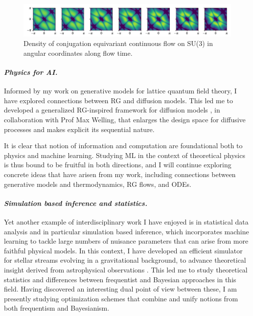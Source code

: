 \documentclass[11pt]{article}
\begin{document}
\begin{figure}
    \centering
    \includegraphics[width=\linewidth]{su3.pdf}
    \vspace{-25pt}
    \caption{\footnotesize Density of conjugation equivariant continuous flow on SU(3) in angular coordinates along flow time.}
    \label{fig:su3}
    \vspace{-10pt}
\end{figure}

\paragraph{\textit{{Physics for AI.}}}
Informed by my work on generative models for lattice quantum field theory, I have explored connections between RG and diffusion models.
This led me to developed a generalized RG-inspired framework for diffusion models \cite{gerdes2024gudgenerationunifieddiffusion}, in collaboration with Prof Max Welling, that enlarges the design space for diffusive processes and makes explicit its sequential nature.

\textbf{\color{royalblue}{Future Directions.}}
It is clear that notion of information and computation are foundational both to physics and machine learning.
Studying ML in the context of theoretical physics is thus bound to be fruitful in both directions, and I will continue exploring concrete ideas that have arisen from my work, including connections between generative models and thermodynamics, RG flows, and ODEs.

\paragraph{\textit{{Simulation based inference and statistics.}}}
Yet another example of interdisciplinary work I have enjoyed is in statistical data analysis and in particular simulation based inference, which incorporates machine learning to tackle large numbers of nuisance parameters that can arise from more faithful physical models.
In this context, I have developed an efficient simulator for stellar streams evolving in a gravitational background, to advance theoretical insight derived from astrophysical observations  \cite{alvey2023AlbatrossScalable}.
This led me to study theoretical statistics and differences between frequentist and Bayesian approaches in this field.
Having discovered an interesting dual point of view between these, I am presently studying optimization schemes that combine and unify notions from both frequentism and Bayesianism.




{
    \small
    
}
\end{document}
